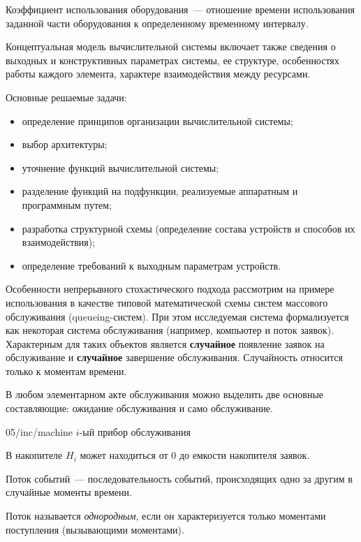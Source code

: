 \begin{dd}
    Коэффициент использования оборудования~--- отношение времени использования заданной части оборудования к определенному временному интервалу.
\end{dd}

Концептуальная модель вычислительной системы включает также сведения о выходных и конструктивных параметрах системы, ее структуре, особенностях работы каждого элемента, характере взаимодействия между ресурсами.

Основные решаемые задачи:

\begin{itemize}
    \item определение принципов организации вычислительной системы;
    \item выбор архитектуры;
    \item уточнение функций вычислительной системы;
    \item разделение функций на подфункции, реализуемые аппаратным и программным путем;
    \item разработка структурной схемы (определение состава устройств и способов их взаимодействия);
    \item определение требований к выходным параметрам устройств.
\end{itemize}

Особенности непрерывного стохастического подхода рассмотрим на примере использования в качестве типовой математической схемы систем массового обслуживания (queueing-систем). При этом исследуемая система формализуется как некоторая система обслуживания (например, компьютер и поток заявок). Характерным для таких объектов является \textbf{случайное} появление заявок на обслуживание и \textbf{случайное} завершение обслуживания. Случайность относится только к моментам времени.

В любом элементарном акте обслуживания можно выделить две основные составляющие: ожидание обслуживания и само обслуживание.

\image
{\textwidth}
{05/inc/machine}
{$i$-ый прибор обслуживания}

В накопителе $H_i$ может находиться от $0$ до емкости накопителя заявок.

\begin{dd}
    Поток событий~--- последовательность событий, происходящих одно за другим в случайные моменты времени.
\end{dd}

\begin{dd}
    Поток называется \textit{однородным}, если он характеризуется только моментами поступления (вызывающими моментами).
\end{dd}


